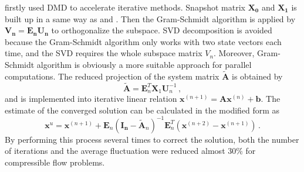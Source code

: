 \citet{andersson_novel} firstly used DMD to accelerate iterative methods.
Snapshot matrix $\mathbf{X_0}$ and $\mathbf{X_1}$ is built up in a same way as  and .
Then the Gram-Schmidt algorithm is applied by $\mathbf{V_n} = \mathbf{{E_n U_n}}$ to orthogonalize the subspace.
SVD decomposition is avoided because the Gram-Schmidt algorithm only works with two state vectors each time, and the SVD requires the whole subspace matrix $V_n$. 
Moreover, Gram-Schmidt algorithm is obviously a more suitable approach for parallel computations. 
The reduced projection of the system matrix $\mathbf{\tilde{A}}$ is obtained by 
\begin{equation}
 \mathbf{\tilde{A}} = \mathbf{E}_n^T \mathbf{X}_{1} \mathbf{U}_n^{-1}  \, ,
 \label{eq:andersson_reduce}
\end{equation}
and is implemented into iterative linear relation $\mathbf{x}^{(n+1)} = \mathbf{A}\mathbf{x}^{(n)} + \mathbf{b}$.
The estimate of the converged solution can be calculated in the modified form as
\begin{equation}
 \mathbf{x}^{u} = \mathbf{x}^{(n+1)} + \mathbf{E}_n(\mathbf{I_n} - \mathbf{\tilde{A}}_n)^{-1} \mathbf{E}_n^T(\mathbf{x}^{(n+2)} - \mathbf{x}^{(n+1)}) \, .
 \label{eq:andersson}
\end{equation}
By performing this process several times to correct the solution, both the number of iterations and the average fluctuation were reduced almost 30\% for compressible flow problems. 

